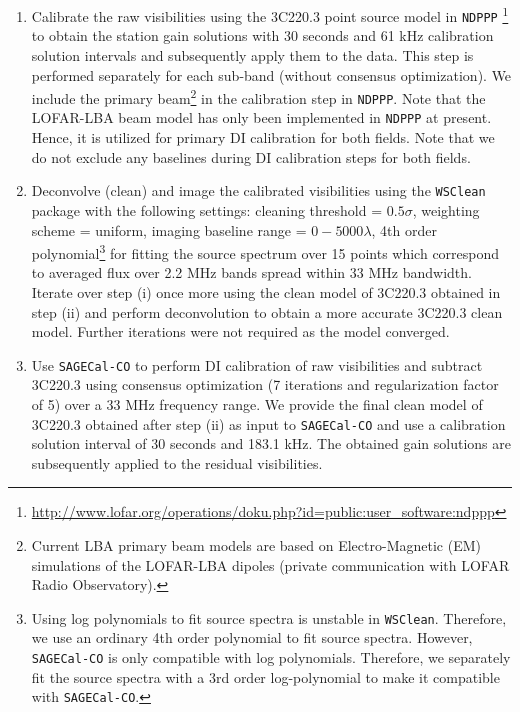 \documentclass[fleqn,usenatbib]{mnras}
\begin{document}
\begin{enumerate}

\item Calibrate the raw visibilities using the 3C220.3 point source model in \texttt{NDPPP} \footnote{\url{http://www.lofar.org/operations/doku.php?id=public:user_software:ndppp}} to obtain the station gain solutions with 30 seconds and 61 kHz calibration solution intervals and subsequently apply them to the data. This step is performed separately for each sub-band (without consensus optimization). We include the primary beam\footnote{Current LBA primary beam models are based on Electro-Magnetic (EM) simulations of the LOFAR-LBA dipoles (private communication with LOFAR Radio Observatory).} in the calibration step in \texttt{NDPPP}. Note that the LOFAR-LBA beam model has only been implemented in \texttt{NDPPP} at present. Hence, it is utilized for primary DI calibration for both fields. Note that we do not exclude any baselines during DI calibration steps for both fields.

\item Deconvolve (clean) and image the calibrated visibilities using the \texttt{WSClean} package \citep{offringa2014} with the following settings: cleaning threshold = $0.5\sigma$, weighting scheme = uniform, imaging baseline range = $0-5000\lambda$, 4th order polynomial\footnote{Using log polynomials to fit source spectra is unstable in \texttt{WSClean}. Therefore, we use an ordinary 4th order polynomial to fit source spectra. However, \texttt{SAGECal-CO} is only compatible with log polynomials. Therefore, we separately fit the source spectra with a 3rd order log-polynomial to make it compatible with \texttt{SAGECal-CO}.} for fitting the source spectrum over 15 points which correspond to averaged flux over 2.2 MHz bands spread within 33 MHz bandwidth. Iterate over step (i) once more using the clean model of 3C220.3 obtained in step (ii) and perform deconvolution to obtain a more accurate 3C220.3 clean model. Further iterations were not required as the model converged.

\item Use \texttt{SAGECal-CO} to perform DI calibration of raw visibilities and subtract 3C220.3 using consensus optimization (7 iterations and regularization factor of 5) over a 33 MHz frequency range. We provide the final clean model of 3C220.3 obtained after step (ii) as input to \texttt{SAGECal-CO} and use a calibration solution interval of 30 seconds and 183.1 kHz. The obtained gain solutions are subsequently applied to the residual visibilities.


\end{enumerate}
\end{document}
